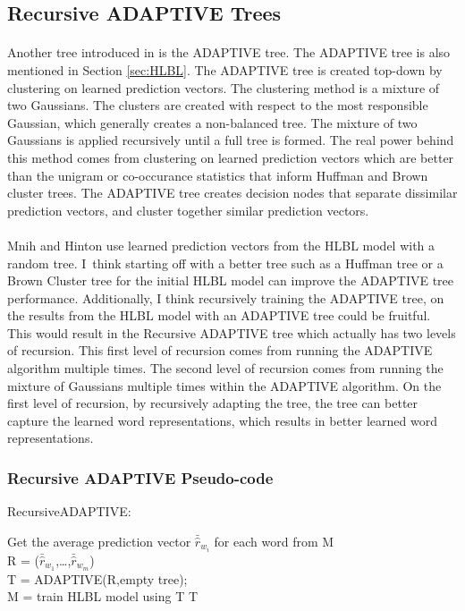 \subsection{Recursive ADAPTIVE Trees} \label{sec:recursiveADAPTIVETree}
\paragraph{}
Another tree introduced in \cite{MnihHinton2009} is the ADAPTIVE tree. The ADAPTIVE tree is also mentioned in Section \ref{sec:HLBL}. The ADAPTIVE tree is created top-down by clustering on learned prediction vectors. The clustering method is a mixture of two Gaussians. The clusters are created with respect to the most responsible Gaussian, which generally creates a non-balanced tree. The mixture of two Gaussians is applied recursively until a full tree is formed. The real power behind this method comes from clustering on learned prediction vectors which are better than the unigram or co-occurance statistics that inform Huffman and Brown cluster trees. The ADAPTIVE tree creates decision nodes that separate dissimilar prediction vectors, and cluster together similar prediction vectors. 

\paragraph{}
Mnih and Hinton use learned prediction vectors from the HLBL model with a random tree. I~think starting off with a better tree such as a Huffman tree or a Brown Cluster tree for the initial HLBL model can improve the ADAPTIVE tree performance. Additionally, I think recursively training the ADAPTIVE tree, on the results from the HLBL model with an ADAPTIVE tree could be fruitful. This would result in the Recursive ADAPTIVE tree which actually has two levels of recursion. This first level of recursion comes from running the ADAPTIVE algorithm multiple times. The second level of recursion comes from running the mixture of Gaussians multiple times within the ADAPTIVE algorithm.  On the first level of recursion, by recursively adapting the tree, the tree can better capture the learned word representations, which results in better learned word representations. 
\subsubsection{Recursive ADAPTIVE Pseudo-code}

\begin{algorithm}
\SetAlgoLined
RecursiveADAPTIVE: \\

 {
 	Get the average prediction vector $\bar{\hat{r}}_{w_i}$ for each word from M
 	\\R = ($\bar{\hat{r}}_{w_1}$,\dots,$\bar{\hat{r}}_{w_m}$)
	\\T = ADAPTIVE(R,empty tree);
	\\M = train HLBL model using T
}
\Return T
\end{algorithm}

